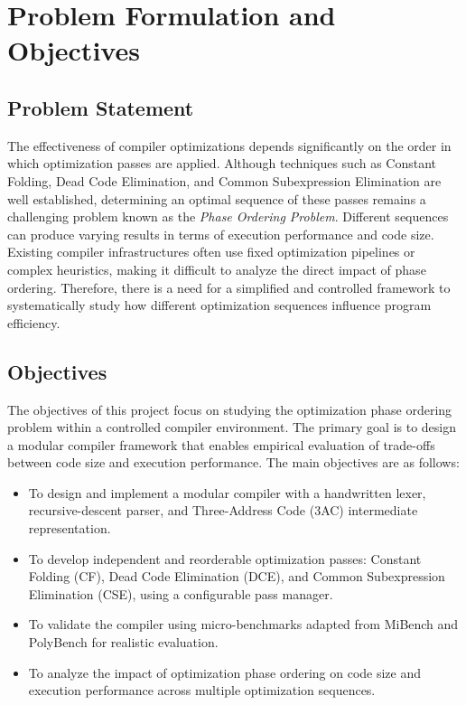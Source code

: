 \documentclass[conference]{IEEEtran}
\begin{document}
\section{Problem Formulation and Objectives}

\subsection{Problem Statement}
The effectiveness of compiler optimizations depends significantly on the order in which optimization passes are applied. Although techniques such as Constant Folding, Dead Code Elimination, and Common Subexpression Elimination are well established, determining an optimal sequence of these passes remains a challenging problem known as the \textit{Phase Ordering Problem}. Different sequences can produce varying results in terms of execution performance and code size. Existing compiler infrastructures often use fixed optimization pipelines or complex heuristics, making it difficult to analyze the direct impact of phase ordering. Therefore, there is a need for a simplified and controlled framework to systematically study how different optimization sequences influence program efficiency.

\subsection{Objectives}
The objectives of this project focus on studying the optimization phase ordering problem within a controlled compiler environment. The primary goal is to design a modular compiler framework that enables empirical evaluation of trade-offs between code size and execution performance. The main objectives are as follows:
\begin{itemize}
    \item To design and implement a modular compiler with a handwritten lexer, recursive-descent parser, and Three-Address Code (3AC) intermediate representation.
    \item To develop independent and reorderable optimization passes: Constant Folding (CF), Dead Code Elimination (DCE), and Common Subexpression Elimination (CSE), using a configurable pass manager.
    \item To validate the compiler using micro-benchmarks adapted from MiBench and PolyBench for realistic evaluation.
    \item To analyze the impact of optimization phase ordering on code size and execution performance across multiple optimization sequences.
\end{itemize}
\end{document}
